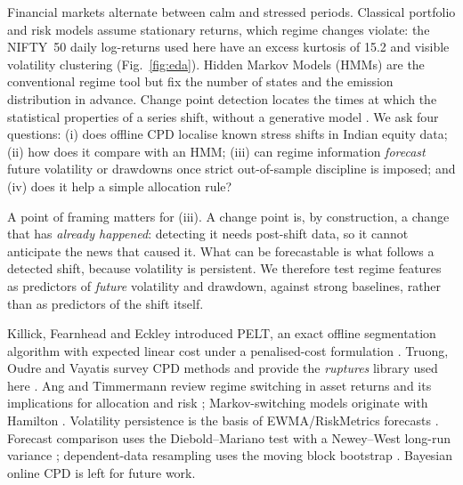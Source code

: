\documentclass[10pt,twocolumn]{article}
\makeatletter
\renewcommand{\section}{\@startsection{section}{1}{0pt}{8pt}{4pt}{\centering\normalfont\small\scshape}}
\makeatother
\begin{document}
\section{Introduction}
Financial markets alternate between calm and stressed periods. Classical portfolio and risk models assume stationary returns, which regime changes violate: the NIFTY~50 daily log-returns used here have an excess kurtosis of 15.2 and visible volatility clustering (Fig.~\ref{fig:eda}). Hidden Markov Models (HMMs) are the conventional regime tool \cite{hamilton,angtim} but fix the number of states and the emission distribution in advance. Change point detection locates the times at which the statistical properties of a series shift, without a generative model \cite{truong}. We ask four questions: (i) does offline CPD localise known stress shifts in Indian equity data; (ii) how does it compare with an HMM; (iii) can regime information \emph{forecast} future volatility or drawdowns once strict out-of-sample discipline is imposed; and (iv) does it help a simple allocation rule?

A point of framing matters for (iii). A change point is, by construction, a change that has \emph{already happened}: detecting it needs post-shift data, so it cannot anticipate the news that caused it. What can be forecastable is what follows a detected shift, because volatility is persistent. We therefore test regime features as predictors of \emph{future} volatility and drawdown, against strong baselines, rather than as predictors of the shift itself.

\section{Related Work}
Killick, Fearnhead and Eckley introduced PELT, an exact offline segmentation algorithm with expected linear cost under a penalised-cost formulation \cite{killick}. Truong, Oudre and Vayatis survey CPD methods and provide the \textit{ruptures} library used here \cite{truong}. Ang and Timmermann review regime switching in asset returns and its implications for allocation and risk \cite{angtim}; Markov-switching models originate with Hamilton \cite{hamilton}. Volatility persistence is the basis of EWMA/RiskMetrics forecasts \cite{rm}. Forecast comparison uses the Diebold--Mariano test \cite{dm} with a Newey--West long-run variance \cite{nw}; dependent-data resampling uses the moving block bootstrap \cite{kunsch}. Bayesian online CPD \cite{adams} is left for future work.
\end{document}
